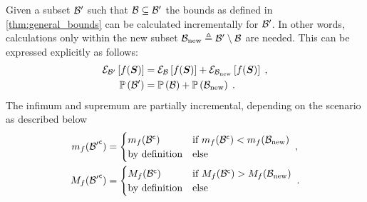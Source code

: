 \begin{corollary}[Incrementality]
	\label{thm:incrementality}
	Given a subset $\subSpace^\prime$ such that $\subSpace\subseteq\subSpace^\prime$ the bounds as defined in \cref{thm:general_bounds} can be calculated incrementally for $\subSpace^\prime$.  In other words, calculations only within the new subset $\subSpace_{\textrm{\textup{new}}}\triangleq\subSpace^\prime\setminus\subSpace$ are needed. This can be expressed explicitly as follows:
	\begin{align}
		\partialexpectation{f(\RV)}{\subSpace^\prime} & =\partialexpectation{f(\RV)}{\subSpace}+\partialexpectation{f(\RV)}{\subSpace_{\textrm{\textup{new}}}}\;,
		\\
		\measure{\subSpace^\prime}& =\measure{\subSpace}+\measure{\subSpace_{\textrm{\textup{new}}}}\;.
	\end{align}
	The infimum and supremum are partially incremental, depending on the scenario as described below
	\begin{subequations}
		\begin{align}
			m_f(\stcomp{\subSpace^\prime})
			& =\begin{cases}
				m_f(\stcomp{\subSpace}) & \textup{if}\ m_f(\stcomp{\subSpace})<m_f(\subSpace_{\textrm{\textup{new}}}) \\
				\textup{by definition}  & \textup{else}
			\end{cases}\;, \\
			M_f(\stcomp{\subSpace^\prime})
			& =\begin{cases}
				M_f(\stcomp{\subSpace}) & \textup{if}\ M_f(\stcomp{\subSpace})>M_f(\subSpace_{\textrm{\textup{new}}}) \\
				\textup{by definition}  & \textup{else}
			\end{cases}\;.
		\end{align}
	\end{subequations}
\end{corollary}
